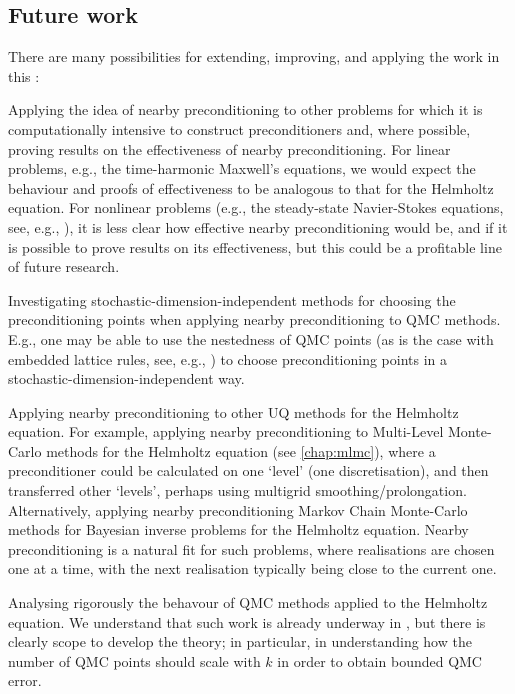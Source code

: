 \subsection{Future work}\label{sec:nbpcfuture}
There are many possibilities for extending, improving, and applying the work in this :
\bit
\item Applying the idea of nearby preconditioning to other problems for which it is computationally intensive to construct preconditioners and, where possible, proving results on the effectiveness of nearby preconditioning. For linear problems, e.g., the time-harmonic Maxwell's equations, we would expect the behaviour and proofs of effectiveness to be analogous to that for the Helmholtz equation. For nonlinear problems (e.g., the steady-state Navier-Stokes equations, see, e.g., \cite{PoSi:12}), it is less clear how effective nearby preconditioning would be, and if it is possible to prove results on its effectiveness, but this could be a profitable line of future research.
\item Investigating stochastic-dimension-independent methods for choosing the preconditioning points when applying nearby preconditioning to QMC methods. E.g., one may be able to use the nestedness of QMC points (as is the case with embedded lattice rules, see, e.g., \cite[Property 3, p.2169]{CoKuNu:06}) to choose preconditioning points in a stochastic-dimension-independent way.
\item Applying nearby preconditioning to other UQ methods for the Helmholtz equation. For example, applying nearby preconditioning to Multi-Level Monte-Carlo methods for the Helmholtz equation (see \cref{chap:mlmc}), where a preconditioner could be calculated on one `level' (one discretisation), and then transferred other `levels', perhaps using multigrid smoothing/prolongation. Alternatively, applying nearby preconditioning Markov Chain Monte-Carlo methods for Bayesian inverse problems for the Helmholtz equation. Nearby preconditioning is a natural fit for such problems, where realisations are chosen one at a time, with the next realisation typically being close to the current one.
  \item Analysing rigorously the behavour of QMC methods applied to the Helmholtz equation. We understand that such work is already underway in \cite{GaKuSl}, but there is clearly scope to develop the theory; in particular, in understanding how the number of QMC points should scale with $k$ in order to obtain bounded QMC error.
\eit
